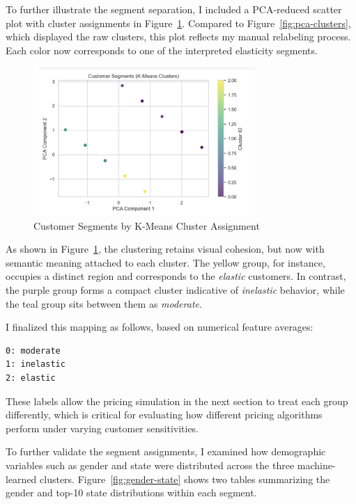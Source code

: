 \documentclass[12pt]{article}
\begin{document}
To further illustrate the segment separation, I included a PCA-reduced scatter plot with cluster assignments in Figure~\ref{fig:cluster-assignment}. Compared to Figure~\ref{fig:pca-clusters}, which displayed the raw clusters, this plot reflects my manual relabeling process. Each color now corresponds to one of the interpreted elasticity segments.

\begin{figure}[h!]
  \centering
  \includegraphics[width=0.75\textwidth]{customer segments (kmeans clusters).png}
  \caption{Customer Segments by K-Means Cluster Assignment}
  \label{fig:cluster-assignment}
\end{figure}

As shown in Figure~\ref{fig:cluster-assignment}, the clustering retains visual cohesion, but now with semantic meaning attached to each cluster. The yellow group, for instance, occupies a distinct region and corresponds to the \textit{elastic} customers. In contrast, the purple group forms a compact cluster indicative of \textit{inelastic} behavior, while the teal group sits between them as \textit{moderate}.

I finalized this mapping as follows, based on numerical feature averages:

\begin{verbatim}
0: moderate
1: inelastic
2: elastic
\end{verbatim}

These labels allow the pricing simulation in the next section to treat each group differently, which is critical for evaluating how different pricing algorithms perform under varying customer sensitivities.

To further validate the segment assignments, I examined how demographic variables such as gender and state were distributed across the three machine-learned clusters. Figure~\ref{fig:gender-state} shows two tables summarizing the gender and top-10 state distributions within each segment. 
\end{document}
